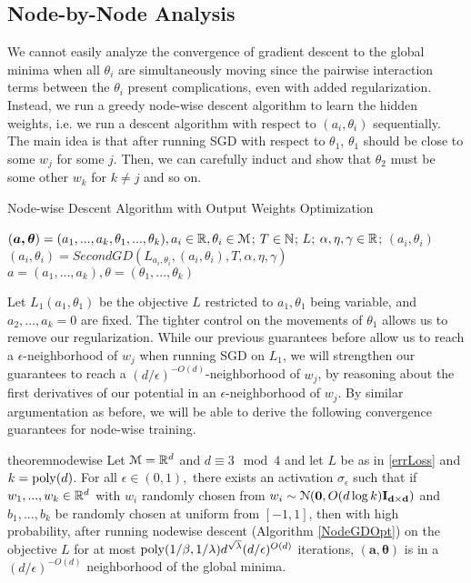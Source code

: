 \subsection{Node-by-Node Analysis}
We cannot easily analyze the convergence of gradient descent to the global minima when all $\theta_i$ are simultaneously moving since the pairwise interaction terms between the $\theta_i$ present complications, even with added regularization. Instead, we run a greedy
node-wise descent  algorithm to learn the hidden weights, i.e. we run a descent algorithm with respect to $(a_i,\theta_i)$ sequentially. The
main idea is that after running SGD with respect to $\theta_1$,
$\theta_1$ should be close to some $w_j$ for some $j$. Then, we can
carefully induct and show that $\theta_2$ must be some other $w_k$ for
$k\neq j$ and so on.

%
\begin{algorithm}[tb]
 \caption{Node-wise Descent Algorithm with Output Weights Optimization}
   \label{NodeGDOpt}
\begin{algorithmic}
  $(\boldsymbol{a,\theta}) = (a_1,...,a_k,\theta_1,...,\theta_k), a_i
  \in{\mathbb{R}}, \theta_i\in\mathcal{M}$;
  $T\in {\mathbb{N}}$; $L$; $\alpha, \eta, \gamma \in {\mathbb{R}}$; 
   $(a_i, \theta_i)$
  \State $(a_i, \theta_i) = SecondGD \left(L_{a_i, \theta_i},(a_i,\theta_i),T, \alpha,\eta,\gamma \right)$
   \EndFor
    $a = (a_1,...,a_k), \theta = (\theta_1,..., \theta_k)$
   \end{algorithmic}
\end{algorithm}

Let $L_1(a_1,\theta_1)$ be the objective $L$ restricted to $a_1,\theta_1$ being variable, and $a_2,...,a_k = 0$ are fixed. The tighter control on the movements of $\theta_1$ allows us to remove our regularization. While our previous guarantees before allow us to reach a $\epsilon$-neighborhood of $w_j$ when running SGD on $L_1$, we will strengthen our guarantees to reach a $(d/\epsilon)^{-O(d)}$-neighborhood of $w_j$, by reasoning about the first derivatives of our potential in an $\epsilon$-neighborhood of $w_j$. By similar argumentation as before, we will be able to derive the following convergence guarantees for node-wise training. 

\begin{restatable}{theorem}{nodewise}\label{nodeWise}
Let $\mathcal{M} = {\mathbb{R}}^{d}$ and $d \equiv 3 \mod 4$ and let $L$ be as in \ref{errLoss} and $k = \mathrm{poly}(d)$. For all $\epsilon \in (0,1),$ there exists an activation $\sigma_\epsilon$ such that if $w_1,...,w_k \in {\mathbb{R}}^d$ with $w_i$ randomly chosen from $w_i \sim  \mathcal{N}({\bf 0}, O(d\log k){\bf I_{d\times d}})$ and $b_1,...,b_k$ be randomly chosen at uniform from $[-1,1]$, then with high probability, after running nodewise descent (Algorithm \ref{NodeGDOpt}) on the objective $L$ for at most $\mathrm{poly}(1/\beta,1/\lambda)d^{\sqrt{\lambda}}(d/\epsilon)^{O(d)}$ iterations, $\boldsymbol{(a,\theta)}$ is in a $(d/\epsilon)^{-O(d)}$ neighborhood of the global minima.
\end{restatable}

